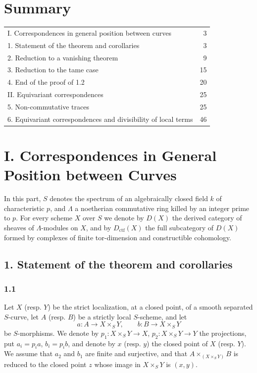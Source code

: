 \documentclass[11pt]{article}
\providecommand{\ctf}{\mathrm{ctf}}
\begin{document}
\section*{Summary}
\begin{tabular}{@{}p{}r@{}}
I. Correspondences in general position between curves & 3\\
1. Statement of the theorem and corollaries & 3\\
2. Reduction to a vanishing theorem & 9\\
3. Reduction to the tame case & 15\\
4. End of the proof of 1.2 & 20\\
II. Equivariant correspondences & 25\\
5. Non-commutative traces & 25\\
6. Equivariant correspondences and divisibility of local terms & 46
\end{tabular}

\section*{I. Correspondences in General Position between Curves}

In this part, $S$ denotes the spectrum of an algebraically closed field $k$ of characteristic $p$, and $\Lambda$ a noetherian commutative ring killed by an integer prime to $p$. For every scheme $X$ over $S$ we denote by $D(X)$ the derived category of sheaves of $\Lambda$-modules on $X$, and by $D_{\ctf}(X)$ the full subcategory of $D(X)$ formed by complexes of finite tor-dimension and constructible cohomology.

\subsection*{1. Statement of the theorem and corollaries}

\subsubsection*{1.1}
Let $X$ (resp. $Y$) be the strict localization, at a closed point, of a smooth separated $S$-curve, let $A$ (resp. $B$) be a strictly local $S$-scheme, and let
\[
a:A\longrightarrow X\times_S Y,
\qquad
b:B\longrightarrow X\times_S Y
\]
be $S$-morphisms. We denote by $p_1:X\times_S Y\to X$, $p_2:X\times_S Y\to Y$ the projections, put $a_i=p_i a$, $b_i=p_i b$, and denote by $x$ (resp. $y$) the closed point of $X$ (resp. $Y$). We assume that $a_2$ and $b_1$ are finite and surjective, and that $A\times_{(X\times_S Y)}B$ is reduced to the closed point $z$ whose image in $X\times_S Y$ is $(x,y)$.
\end{document}
